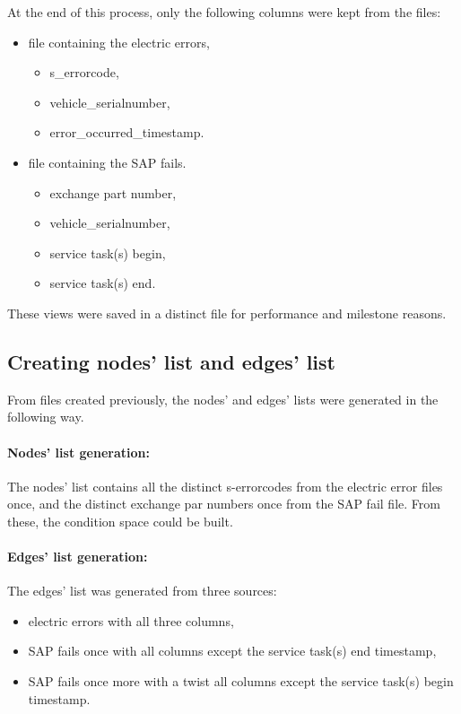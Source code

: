 At the end of this process, only the following columns were kept from the files:
\begin{itemize}
			\item{file containing the electric errors,}
			\begin{itemize}
				\item{s\_errorcode,}
				\item{vehicle\_serialnumber,}
				\item{error\_occurred\_timestamp.}
			\end{itemize}
			\item{file containing the SAP fails.}
			\begin{itemize}
				\item{exchange part number,}
				\item{vehicle\_serialnumber,}
				\item{service task(s) begin,}
				\item{service task(s) end.}
			\end{itemize}
\end{itemize}
These views were saved in a distinct file for performance and milestone reasons.
	\subsection{Creating nodes' list and edges' list}
From files created previously, the nodes' and edges' lists were generated in the following way.
\paragraph{Nodes' list generation:}
The nodes' list contains all the distinct s-errorcodes from the electric error files once, and the distinct exchange par numbers once from the SAP fail file. From these, the condition space could be built.
\paragraph{Edges' list generation:}
The edges' list was generated from three sources: 
\begin{itemize}
	\item{electric errors} with all three columns,
	\item{SAP fails once} with all columns except the service task(s) end timestamp,
	\item{SAP fails once more with a twist} all columns except the service task(s) begin timestamp.
\end{itemize}

